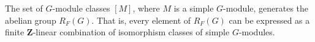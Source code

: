 The set of $G$-module classes $[M]$, where $M$ is a simple $G$-module, generates the abelian group $R_F(G)$. That is, every element of $R_F(G)$ can be expressed as a finite $\mathbf{Z}$-linear combination of isomorphism classes of simple $G$-modules.
